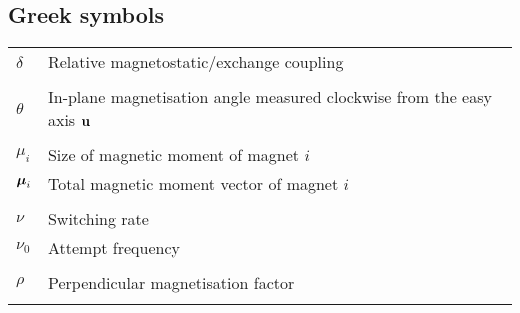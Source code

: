 \subsection*{Greek symbols}
\begin{longtable}[l]{p{60pt} p{350pt}}



	$\delta$ & Relative magnetostatic/exchange coupling \\
	&\\


	$\theta$ & In-plane magnetisation angle measured clockwise from the easy axis $\boldsymbol{\mathbf{u}}$ \\
	&\\




	$\mu_i$ & Size of magnetic moment of magnet $i$ \\
	$\boldsymbol{\mathbf{\mu}}_i$ & Total magnetic moment vector of magnet $i$ \\
	&\\

	
	$\nu$ & Switching rate \\
	$\nu_0$ & Attempt frequency \\
	&\\

	$\rho$ & Perpendicular magnetisation factor \\
	&\\


\end{longtable}

